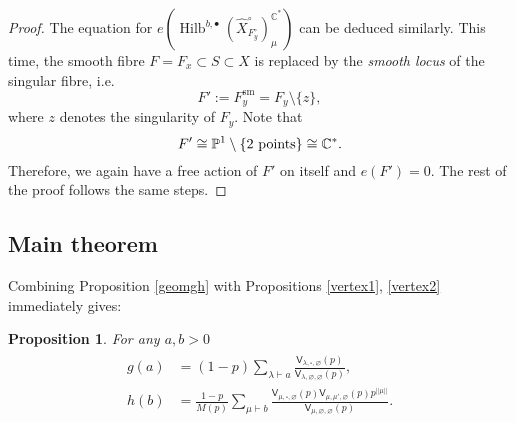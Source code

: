 \documentclass{amsart}
\newtheorem{proposition}[theorem]{Proposition}
\theoremstyle{definition}
\newcommand{\CC} {\mathbb{C}}          %
\newcommand{\PP} {\mathbb{P}}
\newcommand{\sfV}{\mathsf{V}}
\newcommand{\Hilb}{\operatorname{Hilb}}
\newcommand{\sm}{\operatorname{sm}}
\begin{document}
\begin{proof}
The equation for $e(\Hilb^{b,\bullet}(\widehat{X}^{\circ}_{F_{y}^{\circ}})_{\mu}^{\CC^*})$ can be deduced similarly. This time, the smooth fibre $F = F_x \subset S \subset X$ is replaced by the \emph{smooth locus} of the singular fibre, i.e.~ 
$$
F' := F_{y}^{\sm} = F_{y} \setminus \{z\},
$$
where $z$ denotes the singularity of $F_y$. Note that
$$
F' \cong \PP^1 \setminus \{2 \ \rm{points}\} \cong \CC^*.
$$
Therefore, we again have a free action of $F'$ on itself and $e(F') = 0$. The rest of the proof follows the same steps.
\end{proof}   


\subsection{Main theorem}

Combining Proposition \ref{geomgh} with Propositions \ref{vertex1}, \ref{vertex2} immediately gives:
\begin{proposition} \label{combgh}
For any $a,b>0$ 
\begin{align}
\begin{split} \label{gh}
g(a) &= (1-p) \sum_{\lambda \vdash a} \frac{\sfV_{\lambda,\square,\varnothing}(p)}{\sfV_{\lambda,\varnothing,\varnothing}(p)}, \\
h(b) &= \frac{1-p}{M(p)} \sum_{\mu \vdash b} \frac{\sfV_{\mu,\square,\varnothing}(p) \sfV_{\mu,\mu',\varnothing}(p) p^{|\!|\mu|\!|}}{\sfV_{\mu,\varnothing,\varnothing}(p)}.
\end{split}
\end{align}
\end{proposition}
\end{document}
